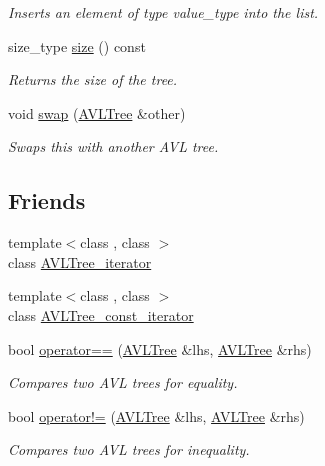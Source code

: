 \begin{DoxyCompactItemize}
\begin{DoxyCompactList}\small\item\em Inserts an element of type value\+\_\+type into the list. \end{DoxyCompactList}\item 
size\+\_\+type \hyperlink{class_a_v_l_tree_aae30d36bc9cb070787c1d0d97413eb86}{size} () const 
\begin{DoxyCompactList}\small\item\em Returns the size of the tree. \end{DoxyCompactList}\item 
void \hyperlink{class_a_v_l_tree_ae5f263d44778e8ca8a4035c53dbd4b40}{swap} (\hyperlink{class_a_v_l_tree}{A\+V\+L\+Tree} \&other)
\begin{DoxyCompactList}\small\item\em Swaps this with another A\+V\+L tree. \end{DoxyCompactList}\end{DoxyCompactItemize}
\subsection*{Friends}
\begin{DoxyCompactItemize}
\item 
{\footnotesize template$<$class , class $>$ }\\class \hyperlink{class_a_v_l_tree_a3b97d3835e767e85b1cededfeefa9d84}{A\+V\+L\+Tree\+\_\+iterator}
\item 
{\footnotesize template$<$class , class $>$ }\\class \hyperlink{class_a_v_l_tree_afe091ef781f649e6f53c487b80a067f1}{A\+V\+L\+Tree\+\_\+const\+\_\+iterator}
\item 
bool \hyperlink{class_a_v_l_tree_a39e9bd2267563dcefbe27caeef5b11f1}{operator==} (\hyperlink{class_a_v_l_tree}{A\+V\+L\+Tree} \&lhs, \hyperlink{class_a_v_l_tree}{A\+V\+L\+Tree} \&rhs)
\begin{DoxyCompactList}\small\item\em Compares two A\+V\+L trees for equality. \end{DoxyCompactList}\item 
bool \hyperlink{class_a_v_l_tree_a610d3e95f9713a58a8855da82215aab3}{operator!=} (\hyperlink{class_a_v_l_tree}{A\+V\+L\+Tree} \&lhs, \hyperlink{class_a_v_l_tree}{A\+V\+L\+Tree} \&rhs)
\begin{DoxyCompactList}\small\item\em Compares two A\+V\+L trees for inequality. \end{DoxyCompactList}\end{DoxyCompactItemize}


